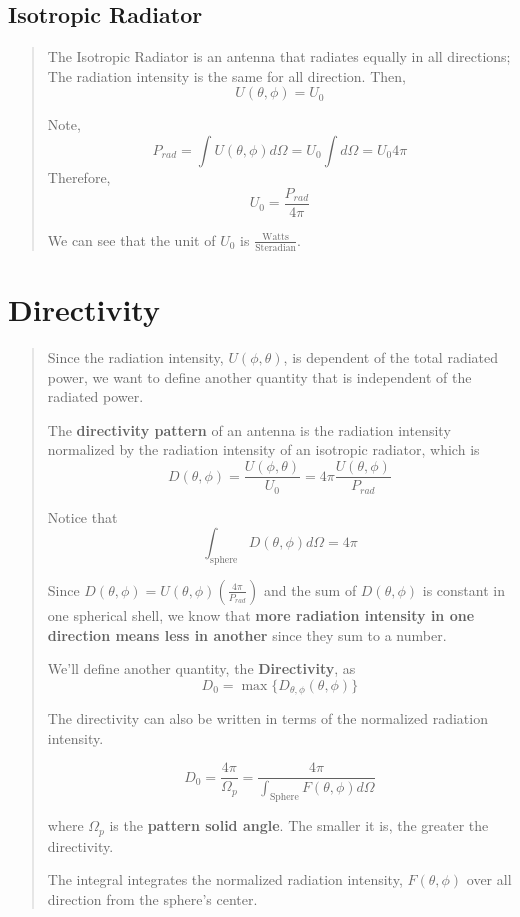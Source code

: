 \documentclass{article} %
\begin{document}
\subsection{Isotropic Radiator}
\begin{quote}
    The Isotropic Radiator is an antenna that radiates equally in all directions; The radiation intensity is the same for all direction. Then,
    \[U(\theta, \phi) = U_0\]

    Note,
    \[P_{rad} = \int U(\theta, \phi) d\Omega = U_0 \int d\Omega = U_0 4\pi\]
    Therefore,
    \[U_0 = \frac{P_{rad}}{4\pi}\]

    We can see that the unit of $U_0$ is $\frac{\text{Watts}}{\text{Steradian}}$.

\end{quote}

\section{Directivity}
\begin{quote}
    Since the radiation intensity, $U(\phi, \theta)$, is dependent of the total radiated power, we want to define another quantity that is independent of the radiated power.

    The \textbf{directivity pattern} of an antenna is the radiation intensity normalized by the radiation intensity of an isotropic radiator, which is
    \[D(\theta, \phi) = \frac{U(\phi, \theta)}{U_0} = 4 \pi \frac{U(\theta, \phi)}{P_{rad}}\]

    Notice that \[\int_{\text{sphere}}D(\theta, \phi)  d\Omega = 4 \pi\]

    Since $D(\theta, \phi) = U(\theta, \phi)(\frac{4\pi}{P_{rad}})$ and the sum of $D(\theta, \phi)$ is constant in one spherical shell, we know that \textbf{more radiation intensity in one direction means less in another} since they sum to a number.
    \bigskip

    We'll define another quantity, the \textbf{Directivity}, as
    \[D_0 = \max\{D_{\theta, \phi}(\theta, \phi)\}\]

    The directivity can also be written in terms of the normalized radiation intensity.

    \[D_0 = \frac{4 \pi}{\Omega_p} = \frac{4\pi}{\int_{\text{Sphere}} F(\theta, \phi) d\Omega}\]

    where $\Omega_p$ is the \textbf{pattern solid angle}. The smaller it is, the greater the directivity.

    The integral integrates the normalized radiation intensity, $F(\theta, \phi)$ over all direction from the sphere's center.

\end{quote}
\end{document}
